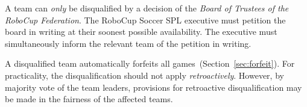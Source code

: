 A team can \textit{only} be disqualified by a decision of the \textit{Board of Trustees of the RoboCup Federation}.
The RoboCup Soccer SPL executive must petition the board in writing at their soonest possible availability.
The executive must simultaneously inform the relevant team of the petition in writing.

A disqualified team automatically forfeits all games~(\cf Section~\ref{sec:forfeit}).
For practicality, the disqualification should not apply \textit{retroactively}.
However, by majority vote of the team leaders, provisions for retroactive disqualification may be made in the fairness of the affected teams.
